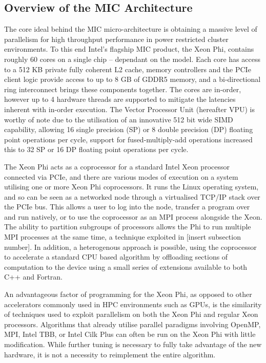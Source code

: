 \documentclass{easychair}
\begin{document}
\subsection{Overview of the MIC Architecture}
\label{sect:mic}

The core ideal behind the MIC micro-architecture is obtaining a massive level of parallelism for high throughput 
performance in power restricted cluster environments. To this end Intel's flagship MIC product, the Xeon Phi, 
contains roughly 60 cores on a single chip – dependant on the model. Each core has access to a 512 KB private 
fully coherent L2 cache, memory controllers and the PCIe client logic provide access to up to 8 GB of GDDR5 
memory, and a bi-directional ring interconnect brings these components together. The cores are in-order, however 
up to 4 hardware threads are supported to mitigate the latencies inherent with in-order execution. The Vector 
Processor Unit (hereafter VPU) is worthy of note due to the utilisation of an innovative 512 bit wide SIMD 
capability, allowing 16 single precision (SP) or 8 double precision (DP) floating point operations per cycle, 
support for fused-multiply-add operations increased this to 32 SP or 16 DP floating point operations per cycle. 

The Xeon Phi acts as a coprocessor for a standard Intel Xeon processor connected via PCIe, and there are various 
modes of execution on a system utilising one or more Xeon Phi coprocessors. It runs the Linux operating system, 
and so can be seen as a networked node through a virtualised TCP/IP stack over the PCIe bus. This allows a user 
to log into the node, transfer a program over and run natively, or to use the coprocessor as an MPI process alongside 
the Xeon. The ability to partition subgroups of processors allows the Phi to run multiple MPI processes at the same 
time, a technique exploited in [insert subsection number]. In addition, a heterogenous approach is possible, using 
the coprocessor to accelerate a standard CPU based algorithm by offloading sections of computation to the device using 
a small series of extensions available to both C++ and Fortran. 

An advantageous factor of programming for the Xeon Phi, as opposed to other accelerators commonly used in HPC 
environments such as GPUs, is the similarity of techniques used to exploit parallelism on both the Xeon Phi and 
regular Xeon processors. Algorithms that already utilise parallel paradigms involving OpenMP, MPI, Intel TBB, or 
Intel Cilk Plus can often be run on the Xeon Phi with little modification. While further tuning is necessary to 
fully take advantage of the new hardware, it is not a necessity to reimplement the entire algorithm.   
\end{document}

